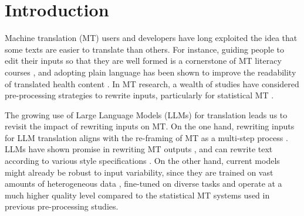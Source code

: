 \section{Introduction}



Machine translation (MT) users and developers have long exploited the idea that some texts are easier to translate than others. For instance, guiding people to edit their inputs so that they are well formed is a cornerstone of MT literacy courses \citep{bowker-2021-promoting,steigerwald-etal-2022-overcoming}, and adopting plain language has been shown to improve the readability of translated health content \citep{Rossetti2019}. In MT research, a wealth of studies have considered pre-processing strategies to rewrite inputs, particularly for statistical MT \citep{XiaMcCord2004,callison-burch-etal-2006-improved,stajner-popovic-2016-text}.%


The growing use of Large Language Models (LLMs) for translation leads us to revisit the impact of rewriting inputs on MT. On the one hand, rewriting inputs for LLM translation aligns with the re-framing of MT as a multi-step process \citep{Briakou}. LLMs have shown promise in rewriting MT outputs \citep{ki2024guiding, zeng2024improving, xu2024llmrefine}, and can rewrite text according to various style specifications \citep{raheja-etal-2023-coedit, hallinan2023steer, shu2023rewritelm, dipper}. On the other hand, current models might already be robust to input variability, since they are trained on vast amounts of heterogeneous data \citep{touvron2023llama}, fine-tuned on diverse tasks \citep{raffel-etal-2020-exploring,alves2024tower} and operate at a much higher quality level compared to the statistical MT systems used in previous pre-processing studies.%

